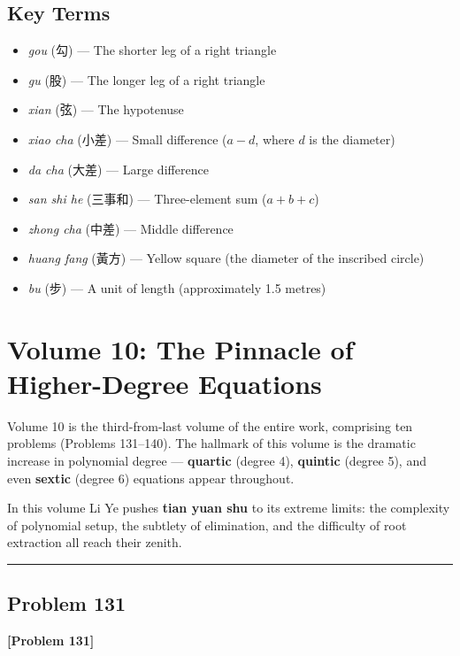 \documentclass[11pt,a4paper]{book}
\newcommand{\longline}{\noindent\rule{\textwidth}{0.4pt}}
\begin{document}
\section*{Key Terms}

\begin{itemize}[leftmargin=2em]
  \item \textit{gou} (勾) --- The shorter leg of a right triangle
  \item \textit{gu} (股) --- The longer leg of a right triangle
  \item \textit{xian} (弦) --- The hypotenuse
  \item \textit{xiao cha} (小差) --- Small difference ($a - d$, where $d$ is the diameter)
  \item \textit{da cha} (大差) --- Large difference
  \item \textit{san shi he} (三事和) --- Three-element sum ($a + b + c$)
  \item \textit{zhong cha} (中差) --- Middle difference
  \item \textit{huang fang} (黃方) --- Yellow square (the diameter of the inscribed circle)
  \item \textit{bu} (步) --- A unit of length (approximately 1.5 metres)
\end{itemize}

\newpage


\chapter{Volume 10: The Pinnacle of Higher-Degree Equations}
\label{ch:vol10}

Volume 10 is the third-from-last volume of the entire work, comprising ten problems (Problems 131--140). The hallmark of this volume is the dramatic increase in polynomial degree --- \textbf{quartic} (degree 4), \textbf{quintic} (degree 5), and even \textbf{sextic} (degree 6) equations appear throughout.

In this volume Li Ye pushes \textbf{tian yuan shu} to its extreme limits: the complexity of polynomial setup, the subtlety of elimination, and the difficulty of root extraction all reach their zenith.

\longline

\section{Problem 131}
\label{sec:prob131}

\noindent\textbf{\color{probcolor}[Problem 131]}
\end{document}
